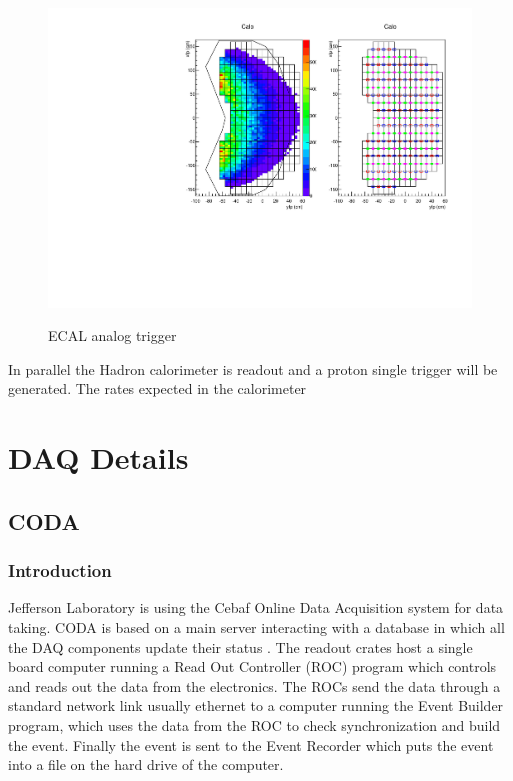 \documentclass{article}
\begin{document}
\begin{figure}
  \centering
  \includegraphics[width=\textwidth]{figs/cfpa.pdf}\\
  \caption{ECAL analog trigger }\label{fig:ECALTrig}
\end{figure}

In parallel the Hadron calorimeter is readout and a proton single trigger will be generated.
The rates expected in the calorimeter

\newpage

\section{DAQ Details}
\subsection{CODA}
\subsubsection{Introduction}
Jefferson Laboratory is using the Cebaf Online Data Acquisition system for data taking.
CODA is based on a main server interacting with a database in which all the DAQ components update their status . The readout crates host a single board computer running a Read Out Controller (ROC) program which controls and reads out the data from the electronics. The ROCs send the data through a standard network link usually ethernet to a computer running the Event Builder program, which uses the data from the ROC to check synchronization and build the event. Finally the event is sent to the Event Recorder which puts the event into a file on the hard drive of the computer.
\end{document}
